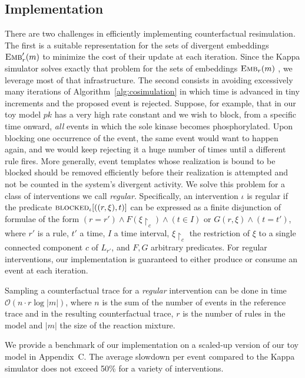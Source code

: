 
\subsection{Implementation}\label{subsec:implementation}

There are two challenges in efficiently implementing counterfactual
resimulation. The first is a suitable representation for the sets of
divergent embeddings ${\textsc{Emb}}'_{r}(m)$ to minimize the cost of their
update at each iteration. Since the Kappa simulator solves exactly
that problem for the sets of embeddings ${\textsc{Emb}}_{r}(m)$
\cite{DanosEtAl-APLAS07}, we leverage most of that infrastructure. The
second consists in avoiding excessively many iterations of
Algorithm~\ref{alg:cosimulation} in which time is advanced in tiny
increments and the proposed event is rejected.
Suppose, for example, that in our toy model
$pk$ has a very high rate constant and we wish to block, from a
specific time onward, \emph{all} events in which the sole kinase
becomes phosphorylated. Upon blocking one occurrence of the event, the
same event would want to happen again, and we would keep rejecting it
a huge number of times until a different rule fires. More generally,
event templates whose realization is bound to be blocked should be
removed efficiently before their realization is attempted and not be
counted in the system's divergent activity. We solve this problem
for a class of interventions we call \emph{regular}.
Specifically, an intervention $\iota$ is regular if
the predicate ${\textsc{blocked}}_{\iota}[((r, \xi), t)]$ can be expressed as a
finite disjunction of formulae of the form
$(r \!=\! r') \wedge F(\xi{\restriction_{c}}) \wedge (t \!\in\! I)$ or
$G(r, \xi) \wedge (t \!=\! t')$, where $r'$ is a rule, $t'$ a time, $I$ a
time interval, $\xi{\restriction_{c}}$ the restriction of $\xi$ to a
single connected component $c$ of $L_{r'}$, and $F, G$ arbitrary
predicates. For regular interventions, our implementation is
guaranteed to either produce or consume an event at each iteration.

\begin{proposition}
  Sampling a counterfactual trace for a \emph{regular} intervention
  can be done in time $\mathcal{O}(n \cdot r \log|m|)$, where $n$ is
  the sum of the number of events in the reference trace and in the
  resulting counterfactual trace, $r$ is the number of rules in the
  model and $|m|$ the size of the reaction mixture.
\end{proposition}

We provide a benchmark of our implementation on a scaled-up version of
our toy model in Appendix~C. The average slowdown per
event compared to the Kappa simulator does not exceed 50\% for a
variety of interventions.

\medskip